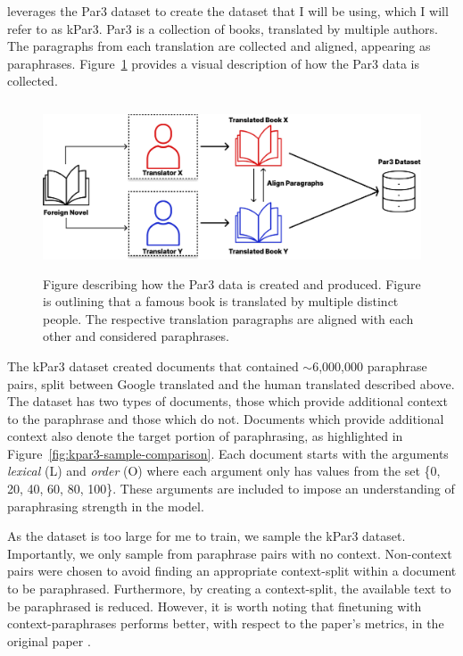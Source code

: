 \documentclass{l4proj}
\theoremstyle{definition}
\begin{document}
        \citet{krishna2023paraphrasing} leverages the Par3 dataset \citet{Par3_2022} to create the dataset that I will be using, which I will refer to as kPar3. Par3 is a collection of books, translated by multiple authors. The paragraphs from each translation are collected and aligned, appearing as paraphrases. Figure~\ref{fig:par3-collection-process} provides a visual description of how the Par3 data is collected.

        

        \begin{figure}[ht]
            \centering
            \includegraphics[width=1\linewidth, height=5cm, keepaspectratio]{images/methods/par3-collection-explanation.pdf}
            \caption{Figure describing how the Par3 data is created and produced. Figure is outlining that a famous book is translated by multiple distinct people. The respective translation paragraphs are aligned with each other and considered paraphrases.}
            \label{fig:par3-collection-process}
        \end{figure}

        The kPar3 dataset created documents that contained $\sim$6,000,000 paraphrase pairs, split between Google translated and the human translated described above. The dataset has two types of documents, those which provide additional context to the paraphrase and those which do not. Documents which provide additional context also denote the target portion of paraphrasing, as highlighted in Figure~\ref{fig:kpar3-sample-comparison}. Each document starts with the arguments \emph{lexical} (L) and \emph{order} (O) where each argument only has values from the set \{0, 20, 40, 60, 80, 100\}. These arguments are included to impose an understanding of paraphrasing strength in the model.
        
        As the dataset is too large for me to train, we sample the kPar3 dataset. Importantly, we only sample from paraphrase pairs with no context. Non-context pairs were chosen to avoid finding an appropriate context-split within a document to be paraphrased. Furthermore, by creating a context-split, the available text to be paraphrased is reduced. However, it is worth noting that finetuning with context-paraphrases performs better, with respect to the paper's metrics, in the original paper \citep{krishna2023paraphrasing}.
            
\end{document}
